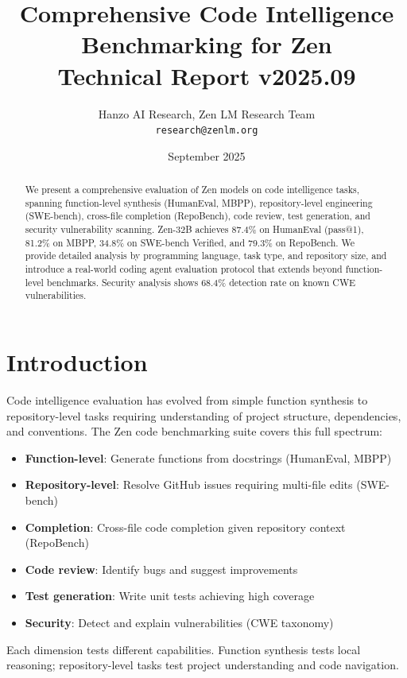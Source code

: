\documentclass[11pt,a4paper]{article}
\title{\textbf{Comprehensive Code Intelligence Benchmarking for Zen}\\
\large Technical Report v2025.09}
\author{Hanzo AI Research, Zen LM Research Team\\
\texttt{research@zenlm.org}}
\date{September 2025}
\begin{document}
\maketitle

\begin{abstract}
We present a comprehensive evaluation of Zen models on code intelligence tasks,
spanning function-level synthesis (HumanEval, MBPP), repository-level engineering
(SWE-bench), cross-file completion (RepoBench), code review, test generation, and
security vulnerability scanning. Zen-32B achieves 87.4\% on HumanEval (pass@1),
81.2\% on MBPP, 34.8\% on SWE-bench Verified, and 79.3\% on RepoBench. We provide
detailed analysis by programming language, task type, and repository size, and
introduce a real-world coding agent evaluation protocol that extends beyond
function-level benchmarks. Security analysis shows 68.4\% detection rate on
known CWE vulnerabilities.
\end{abstract}

\section{Introduction}

Code intelligence evaluation has evolved from simple function synthesis to
repository-level tasks requiring understanding of project structure, dependencies,
and conventions. The Zen code benchmarking suite covers this full spectrum:

\begin{itemize}
  \item \textbf{Function-level}: Generate functions from docstrings (HumanEval, MBPP)
  \item \textbf{Repository-level}: Resolve GitHub issues requiring multi-file edits (SWE-bench)
  \item \textbf{Completion}: Cross-file code completion given repository context (RepoBench)
  \item \textbf{Code review}: Identify bugs and suggest improvements
  \item \textbf{Test generation}: Write unit tests achieving high coverage
  \item \textbf{Security}: Detect and explain vulnerabilities (CWE taxonomy)
\end{itemize}

Each dimension tests different capabilities. Function synthesis tests local
reasoning; repository-level tasks test project understanding and code navigation.
\end{document}
